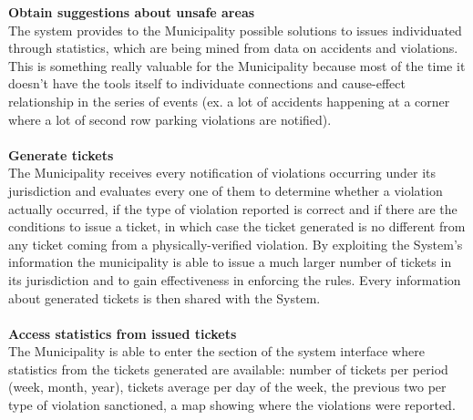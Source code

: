 \documentclass {article}
\begin{document}
\begin{itemize}
		{\bf Obtain suggestions about unsafe areas}\\
		The system provides to the Municipality possible solutions to issues individuated through statistics, which are being mined from data on accidents and violations. This is something really valuable for the Municipality because most of the time it doesn’t have the tools itself to individuate connections and cause-effect relationship in the series of events (ex. a lot of accidents happening at a corner where a lot of second row parking violations are notified).\\ \\
		{\bf Generate tickets}\\
		The Municipality receives every notification of violations occurring under its jurisdiction and evaluates every one of them to determine whether a violation actually occurred, if the type of violation reported is correct and if there are the conditions to issue a ticket, in which case the ticket generated is no different from any ticket coming from a physically-verified violation. By exploiting the System’s information the municipality is able to issue a much larger number of tickets in its jurisdiction and to gain effectiveness in enforcing the rules. Every information about generated tickets is then shared with the System.\\ \\
		{\bf Access statistics from issued tickets}\\
		The Municipality is able to enter the section of the system interface where statistics from the tickets generated are available: number of tickets per period (week, month, year), tickets average per day of the week, the previous two per type of violation sanctioned, a map showing where the violations were reported.\\ \\
		
		
	\end{itemize}
		
\end{document}
